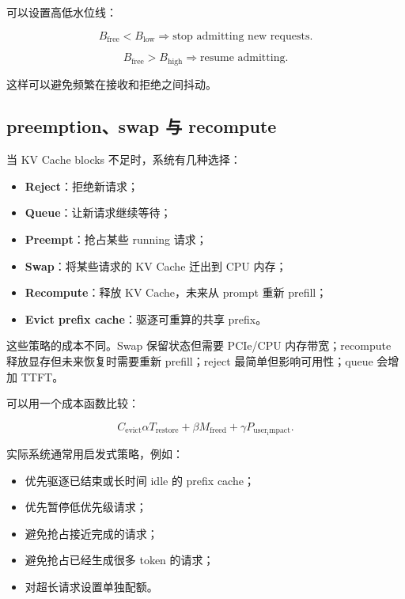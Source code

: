 可以设置高低水位线：

\[
B_{\mathrm{free}} < B_{\mathrm{low}}
\Rightarrow
\text{stop admitting new requests}.
\]

\[
B_{\mathrm{free}} > B_{\mathrm{high}}
\Rightarrow
\text{resume admitting}.
\]

这样可以避免频繁在接收和拒绝之间抖动。

\subsection{preemption、swap 与 recompute}
\label{subsec:preemption-swap-recompute}

当 KV Cache blocks 不足时，系统有几种选择：

\begin{itemize}
\item \textbf{Reject}：拒绝新请求；
\item \textbf{Queue}：让新请求继续等待；
\item \textbf{Preempt}：抢占某些 running 请求；
\item \textbf{Swap}：将某些请求的 KV Cache 迁出到 CPU 内存；
\item \textbf{Recompute}：释放 KV Cache，未来从 prompt 重新 prefill；
\item \textbf{Evict prefix cache}：驱逐可重算的共享 prefix。
\end{itemize}

这些策略的成本不同。Swap 保留状态但需要 PCIe/CPU 内存带宽；recompute 释放显存但未来恢复时需要重新 prefill；reject 最简单但影响可用性；queue 会增加 TTFT。

可以用一个成本函数比较：

\[
C_{\mathrm{evict}}
\alpha T_{\mathrm{restore}}
+
\beta M_{\mathrm{freed}}
+
\gamma P_{\mathrm{user_impact}}.
\]

实际系统通常用启发式策略，例如：

\begin{itemize}
\item 优先驱逐已结束或长时间 idle 的 prefix cache；
\item 优先暂停低优先级请求；
\item 避免抢占接近完成的请求；
\item 避免抢占已经生成很多 token 的请求；
\item 对超长请求设置单独配额。
\end{itemize}


